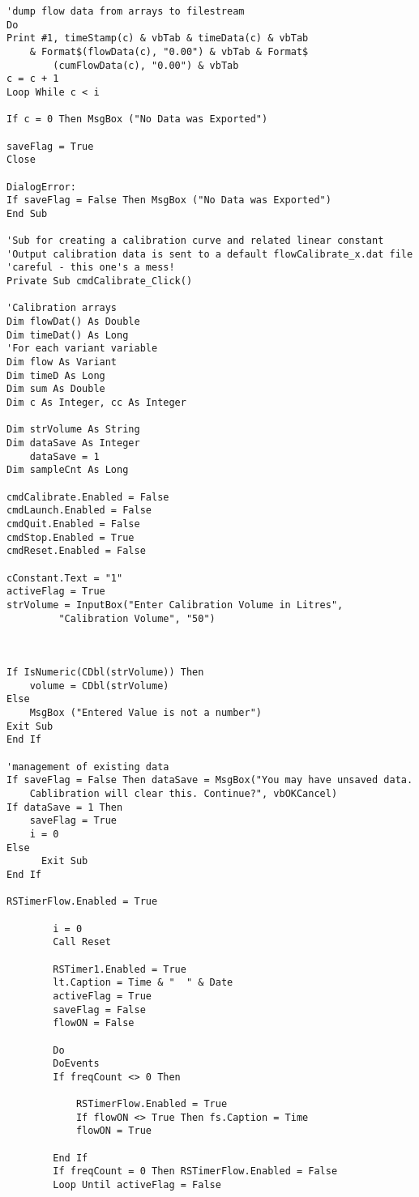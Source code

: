 \begin{singlespace}
\begin{small}
\begin{verbatim}
'dump flow data from arrays to filestream
Do
Print #1, timeStamp(c) & vbTab & timeData(c) & vbTab 
	& Format$(flowData(c), "0.00") & vbTab & Format$
		(cumFlowData(c), "0.00") & vbTab
c = c + 1
Loop While c < i

If c = 0 Then MsgBox ("No Data was Exported")

saveFlag = True
Close

DialogError:
If saveFlag = False Then MsgBox ("No Data was Exported")
End Sub

'Sub for creating a calibration curve and related linear constant
'Output calibration data is sent to a default flowCalibrate_x.dat file
'careful - this one's a mess!
Private Sub cmdCalibrate_Click()

'Calibration arrays
Dim flowDat() As Double
Dim timeDat() As Long
'For each variant variable
Dim flow As Variant
Dim timeD As Long
Dim sum As Double
Dim c As Integer, cc As Integer

Dim strVolume As String
Dim dataSave As Integer
    dataSave = 1
Dim sampleCnt As Long
    
cmdCalibrate.Enabled = False
cmdLaunch.Enabled = False
cmdQuit.Enabled = False
cmdStop.Enabled = True
cmdReset.Enabled = False

cConstant.Text = "1"
activeFlag = True
strVolume = InputBox("Enter Calibration Volume in Litres",
		 "Calibration Volume", "50")



If IsNumeric(CDbl(strVolume)) Then
    volume = CDbl(strVolume)
Else
    MsgBox ("Entered Value is not a number")
Exit Sub
End If
        
'management of existing data
If saveFlag = False Then dataSave = MsgBox("You may have unsaved data. 
	Cablibration will clear this. Continue?", vbOKCancel)
If dataSave = 1 Then
    saveFlag = True
    i = 0
Else
      Exit Sub
End If
        
RSTimerFlow.Enabled = True
        
        i = 0
        Call Reset
        
        RSTimer1.Enabled = True
        lt.Caption = Time & "  " & Date
        activeFlag = True
        saveFlag = False
        flowON = False
     
        Do
        DoEvents
        If freqCount <> 0 Then
            
            RSTimerFlow.Enabled = True
            If flowON <> True Then fs.Caption = Time
            flowON = True
            
        End If
        If freqCount = 0 Then RSTimerFlow.Enabled = False
        Loop Until activeFlag = False
        

\end{verbatim}
\end{small}
\end{singlespace}
